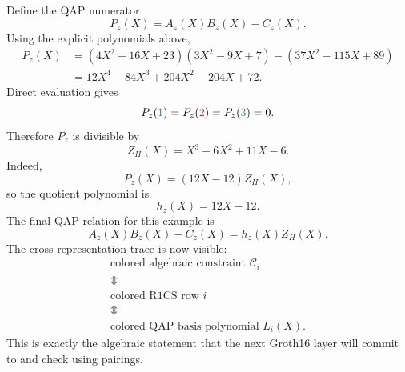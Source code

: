 \documentclass[11pt]{article}
\newcommand{\rowone}[1]{\textcolor{rowonecolor}{#1}}
\newcommand{\rowtwo}[1]{\textcolor{rowtwocolor}{#1}}
\newcommand{\rowthree}[1]{\textcolor{rowthreecolor}{#1}}
\begin{document}
Define the QAP numerator
\[
    P_z(X)=A_z(X)B_z(X)-C_z(X).
\]
Using the explicit polynomials above,
\[
\begin{aligned}
P_z(X)
&=(4X^2-16X+23)(3X^2-9X+7)-(37X^2-115X+89)\\
&=12X^4-84X^3+204X^2-204X+72.
\end{aligned}
\]
Direct evaluation gives
\[
    P_z(\rowone{1})=P_z(\rowtwo{2})=P_z(\rowthree{3})=0.
\]
Therefore $P_z$ is divisible by
\[
    Z_H(X)=X^3-6X^2+11X-6.
\]
Indeed,
\[
    P_z(X)=(12X-12)Z_H(X),
\]
so the quotient polynomial is
\[
    h_z(X)=12X-12.
\]
The final QAP relation for this example is
\[
\boxed{
    A_z(X)B_z(X)-C_z(X)=h_z(X)Z_H(X).
}
\]
The cross-representation trace is now visible:
\[
\begin{array}{c}
\text{colored algebraic constraint }\mathcal C_i\\
\Updownarrow\\
\text{colored R1CS row }i\\
\Updownarrow\\
\text{colored QAP basis polynomial }L_i(X).
\end{array}
\]
This is exactly the algebraic statement that the next Groth16 layer will commit to and check using pairings.
\end{document}
